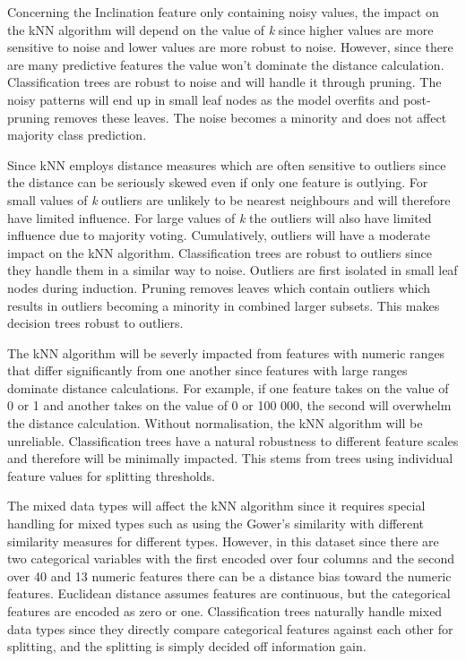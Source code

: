 \documentclass[10pt, conference]{IEEEtran}
\begin{document}
Concerning the Inclination feature only containing noisy values, the impact on the kNN algorithm will depend on the value of \textit{k} since higher values are more sensitive to noise and lower values are more robust to noise. However, since there are many predictive features the value won't dominate the distance calculation. Classification trees are robust to noise and will handle it through pruning. The noisy patterns will end up in small leaf nodes as the model overfits and post-pruning removes these leaves. The noise becomes a minority and does not affect majority class prediction.

Since kNN employs distance measures which are often sensitive to outliers since the distance can be seriously skewed even if only one feature is outlying. For small values of \textit{k} outliers are unlikely to be nearest neighbours and will therefore have limited influence. For large values of \textit{k} the outliers will also have limited influence due to majority voting. Cumulatively, outliers will have a moderate impact on the kNN algorithm. Classification trees are robust to outliers since they handle them in a similar way to noise. Outliers are first isolated in small leaf nodes during induction. Pruning removes leaves which contain outliers which results in outliers becoming a minority in combined larger subsets. This makes decision trees robust to outliers.

The kNN algorithm will be severly impacted from features with numeric ranges that differ significantly from one another since features with large ranges dominate distance calculations. For example, if one feature takes on the value of 0 or 1 and another takes on the value of 0 or 100 000, the second will overwhelm the distance calculation. Without normalisation, the kNN algorithm will be unreliable. Classification trees have a natural robustness to different feature scales and therefore will be minimally impacted. This stems from trees using individual feature values for splitting thresholds.

The mixed data types will affect the kNN algorithm since it requires special handling for mixed types such as using the Gower's similarity with different similarity measures for different types. However, in this dataset since there are two categorical variables with the first encoded over four columns and the second over 40 and 13 numeric features there can be a distance bias toward the numeric features. Euclidean distance assumes features are continuous, but the categorical features are encoded as zero or one. Classification trees naturally handle mixed data types since they directly compare categorical features against each other for splitting, and the splitting is simply decided off information gain.
\end{document}
